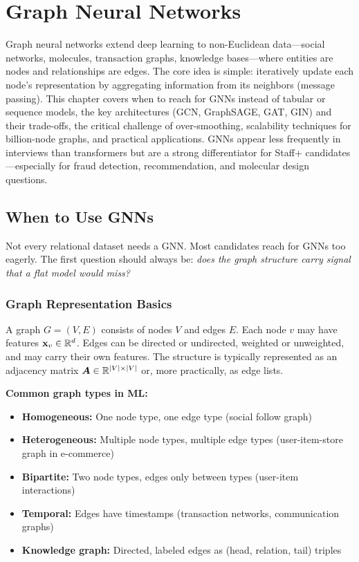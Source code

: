 \chapter{Graph Neural Networks}
\label{chap:graph_neural_networks}

\begin{tldr}
Graph neural networks extend deep learning to non-Euclidean data---social networks, molecules, transaction graphs, knowledge bases---where entities are nodes and relationships are edges. The core idea is simple: iteratively update each node's representation by aggregating information from its neighbors (message passing). This chapter covers when to reach for GNNs instead of tabular or sequence models, the key architectures (GCN, GraphSAGE, GAT, GIN) and their trade-offs, the critical challenge of over-smoothing, scalability techniques for billion-node graphs, and practical applications. GNNs appear less frequently in interviews than transformers but are a strong differentiator for Staff+ candidates---especially for fraud detection, recommendation, and molecular design questions.
\end{tldr}

\section{When to Use GNNs}
\label{sec:when_gnns}

Not every relational dataset needs a GNN. Most candidates reach for GNNs too eagerly. The first question should always be: \textit{does the graph structure carry signal that a flat model would miss?}

\subsection{Graph Representation Basics}

A graph $G = (V, E)$ consists of nodes $V$ and edges $E$. Each node $v$ may have features $\mathbf{x}_v \in \mathbb{R}^d$. Edges can be directed or undirected, weighted or unweighted, and may carry their own features. The structure is typically represented as an adjacency matrix $\bm{A} \in \mathbb{R}^{|V| \times |V|}$ or, more practically, as edge lists.

\textbf{Common graph types in ML:}
\begin{itemize}
    \item \textbf{Homogeneous:} One node type, one edge type (social follow graph)
    \item \textbf{Heterogeneous:} Multiple node types, multiple edge types (user-item-store graph in e-commerce)
    \item \textbf{Bipartite:} Two node types, edges only between types (user-item interactions)
    \item \textbf{Temporal:} Edges have timestamps (transaction networks, communication graphs)
    \item \textbf{Knowledge graph:} Directed, labeled edges as (head, relation, tail) triples
\end{itemize}

